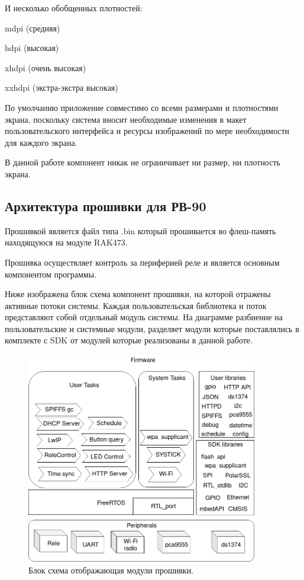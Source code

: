 И несколько обобщенных плотностей: 
\begin{my_enumerate}
\item mdpi (средняя)
\item hdpi (высокая)
\item xhdpi (очень высокая)
\item xxhdpi (экстра-экстра высокая)
\end{my_enumerate}

По умолчанию приложение совместимо со всеми размерами и плотностями экрана, поскольку система вносит необходимые изменения в макет пользовательского интерфейса и ресурсы изображений по мере необходимости для каждого экрана.

В данной работе компонент никак не ограничивает ни размер, ни плотность экрана.






\newpage
\subsection{Архитектура прошивки для РВ-90}
Прошивкой является файл типа .bin который прошивается во флеш-память находящуюся на модуле RAK473.

Прошивка осуществляет контроль за периферией реле и является основным компонентом программы.

Ниже изображена блок схема компонент прошивки, на которой отражены активные потоки системы. Каждая пользовательская библиотека и поток представляют собой отдельный модуль системы. На диаграмме разбиение на пользовательские и системные модули, разделяет модули которые поставлялись в комплекте с SDK от модулей которые реализованы в данной работе.

\begin{figure}[h!]
    \centering
    \includegraphics[width=0.9\textwidth]{firmware_modules_diagram.png}
    \caption{Блок схема отображающая модули прошивки.}
\end{figure}

